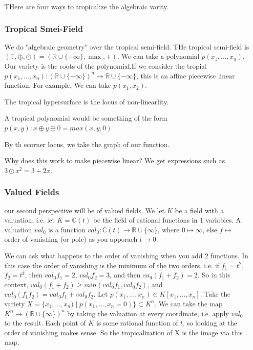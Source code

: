 \documentclass[12pt]{memoir}
\theoremstyle{definition}
\def\RR{{\mathbb R}}
\def\CC{{\mathbb C}}
\begin{document}
THere are four ways to tropicalize the algebraic varity.

\subsubsection{Tropical Smei-Field}
We do "algebraic geometry" over the tropical semi-field. THe tropical semi-field is $(\mathbb{T}, \oplus, \odot ) = ( \RR \cup \{- \infty\}, \max, + )$. We can take a polynomial $p(x_1, \dots, x_n)$. Our variety is the roots of the polynomial.If we consider the tropial $p(x_1, \dots, x_n) : (\RR \cup \{- \infty\})^n \rightarrow \RR \cup \{- \infty\}$, this is an affine piecewise linear function. For example, We can take $p(x_1, x_2)$.



The tropical hypersurface is the locus of non-linearlity.

A tropical polynomial would be something of the form $p(x,y) : x \oplus y \oplus 0= max(x,y,0)$


By th ecorner locus, we take the graph of our function.





Why does this work to make piecewise linear? We get expressions such as $3 \odot x^2 = 3 + 2x$.


\subsubsection{Valued Fields}

our second perspective will be of valued fields. We let $K$ be a field with a valuation, i.e. let $K= \CC(t)$ be the field of rational functions in 1 variables. A valuation $val_0$ is a function $val_0: \CC(t) \rightarrow \RR \cup \{ \infty\}$, where $0 \mapsto \infty$, else $f \mapsto$ order of vanishing (or pole) as you apporach $t \rightarrow 0$.


We can ask what happens to the order of vanishing when you add 2 functions. In this case the order of vanishing is the minimum of the two orders. i.e. if $f_1=t^2$, $f_2=t^3$, then $val_0 f_1 = 2$, $val_0 f_2 = 3$, and then $va_0(f_1+f_2)=2$.  So in this context, $val_0(f_1+f_2) \geq min(val_0 f_1, val_0f_2)$, and $val_0(f_1f_2) = val_0 f_1 + val_0 f_2$. Let $p(x_1, \dots, x_n) \in K[x_1, \dots, x_n]$. Take the variety $X = \{x_1, \dots, x_n) \; |\; p(x_1, \dots, x_n=0) \} \subset K^n$. We can take the map $K^n \rightarrow (\RR \cup \{ \infty\})^n$ by taking the valuation at every coordinate, i.e. apply  $val_{0}$ to the result. Each point of $K$ is some rational function of $t$, so looking at the order of vanishing makes sense. So the tropicalization of X is the image via this map.
\end{document}
